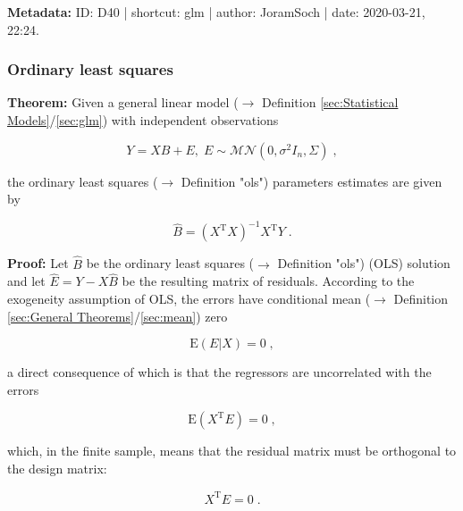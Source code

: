 \documentclass[a4paper,12pt,twoside]{book}
\begin{document}
\vspace{1em}
\textbf{Metadata:} ID: D40 | shortcut: glm | author: JoramSoch | date: 2020-03-21, 22:24.
\vspace{1em}



\subsubsection[\textbf{Ordinary least squares}]{Ordinary least squares} \label{sec:glm-ols}
\setcounter{equation}{0}

\textbf{Theorem:} Given a general linear model ($\rightarrow$ Definition \ref{sec:Statistical Models}/\ref{sec:glm}) with independent observations

\begin{equation} \label{eq:glm-ols-GLM}
Y = X B + E, \; E \sim \mathcal{MN}(0, \sigma^2 I_n, \Sigma) \; ,
\end{equation}

the ordinary least squares ($\rightarrow$ Definition "ols") parameters estimates are given by

\begin{equation} \label{eq:glm-ols-OLS}
\hat{B} = (X^\mathrm{T} X)^{-1} X^\mathrm{T} Y \; .
\end{equation}


\vspace{1em}
\textbf{Proof:} Let $\hat{B}$ be the ordinary least squares ($\rightarrow$ Definition "ols") (OLS) solution and let $\hat{E} = Y - X\hat{B}$ be the resulting matrix of residuals. According to the exogeneity assumption of OLS, the errors have conditional mean ($\rightarrow$ Definition \ref{sec:General Theorems}/\ref{sec:mean}) zero

\begin{equation} \label{eq:glm-ols-OLS-exo}
\mathrm{E}(E|X) = 0 \; ,
\end{equation}

a direct consequence of which is that the regressors are uncorrelated with the errors

\begin{equation} \label{eq:glm-ols-OLS-uncorr}
\mathrm{E}(X^\mathrm{T} E) = 0 \; ,
\end{equation}

which, in the finite sample, means that the residual matrix must be orthogonal to the design matrix:

\begin{equation} \label{eq:glm-ols-X-E-orth}
X^\mathrm{T} \hat{E} = 0 \; .
\end{equation}
\end{document}
